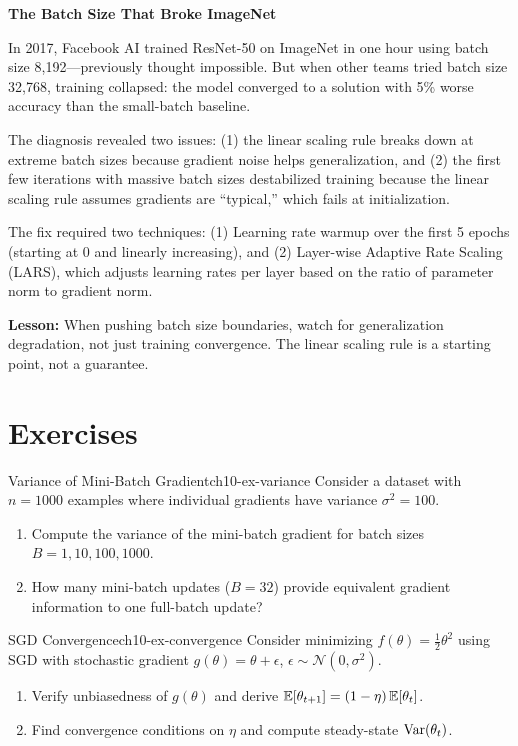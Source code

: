 \documentclass[../../main.tex]{subfiles}
\begin{document}
\begin{warstory}
\textbf{The Batch Size That Broke ImageNet}

In 2017, Facebook AI trained ResNet-50 on ImageNet in one hour using batch size 8,192---previously thought impossible. But when other teams tried batch size 32,768, training collapsed: the model converged to a solution with 5\% worse accuracy than the small-batch baseline.

The diagnosis revealed two issues: (1) the linear scaling rule breaks down at extreme batch sizes because gradient noise helps generalization, and (2) the first few iterations with massive batch sizes destabilized training because the linear scaling rule assumes gradients are ``typical,'' which fails at initialization.

The fix required two techniques: (1) Learning rate warmup over the first 5 epochs (starting at 0 and linearly increasing), and (2) Layer-wise Adaptive Rate Scaling (LARS), which adjusts learning rates per layer based on the ratio of parameter norm to gradient norm.

\textbf{Lesson:} When pushing batch size boundaries, watch for generalization degradation, not just training convergence. The linear scaling rule is a starting point, not a guarantee.
\end{warstory}

\section{Exercises}
\label{sec:ch10-exercises}

\begin{exercise}{Variance of Mini-Batch Gradient}{ch10-ex-variance}
Consider a dataset with $n = 1000$ examples where individual gradients have variance $\sigma^2 = 100$.
\begin{enumerate}[label=(\alph*)]
    \item Compute the variance of the mini-batch gradient for batch sizes $B = 1, 10, 100, 1000$.
    \item How many mini-batch updates ($B = 32$) provide equivalent gradient information to one full-batch update?
\end{enumerate}
\end{exercise}

\begin{exercise}{SGD Convergence}{ch10-ex-convergence}
Consider minimizing $f(\theta) = \frac{1}{2}\theta^2$ using SGD with stochastic gradient $g(\theta) = \theta + \epsilon$, $\epsilon \sim \mathcal{N}(0, \sigma^2)$.
\begin{enumerate}[label=(\alph*)]
    \item Verify unbiasedness of $g(\theta)$ and derive $\operatorname{\mathbb{E}}[\theta_{t+1}] = (1-\eta)\operatorname{\mathbb{E}}[\theta_t]$.
    \item Find convergence conditions on $\eta$ and compute steady-state $\operatorname{Var}(\theta_t)$.
\end{enumerate}
\end{exercise}
\end{document}
